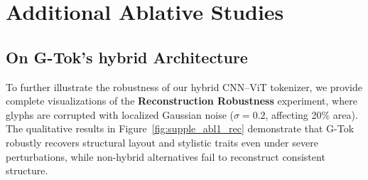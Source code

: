 


\section{Additional Ablative Studies}
\label{sec:Ablate}
\subsection{On G-Tok's hybrid Architecture}
To further illustrate the robustness of our hybrid CNN–ViT tokenizer, we provide complete visualizations of the \textbf{Reconstruction Robustness} experiment, where glyphs are corrupted with localized Gaussian noise ($\sigma = 0.2$, affecting 20\% area).  
The qualitative results in Figure~\ref{fig:supple_abl1_rec} demonstrate that G-Tok robustly recovers structural layout and stylistic traits even under severe perturbations, while non-hybrid alternatives fail to reconstruct consistent structure. 

